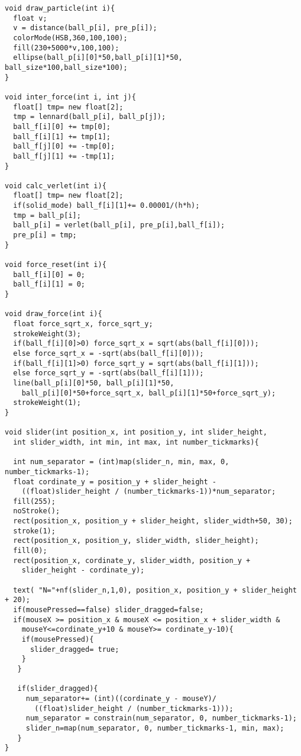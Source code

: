 \begin{framed}
{\begin{verbatim}
void draw_particle(int i){
  float v;
  v = distance(ball_p[i], pre_p[i]);
  colorMode(HSB,360,100,100);
  fill(230+5000*v,100,100);  
  ellipse(ball_p[i][0]*50,ball_p[i][1]*50, ball_size*100,ball_size*100);
}
  
void inter_force(int i, int j){
  float[] tmp= new float[2];
  tmp = lennard(ball_p[i], ball_p[j]);
  ball_f[i][0] += tmp[0];
  ball_f[i][1] += tmp[1];
  ball_f[j][0] += -tmp[0];
  ball_f[j][1] += -tmp[1];
}

void calc_verlet(int i){
  float[] tmp= new float[2];
  if(solid_mode) ball_f[i][1]+= 0.00001/(h*h);
  tmp = ball_p[i];
  ball_p[i] = verlet(ball_p[i], pre_p[i],ball_f[i]);
  pre_p[i] = tmp; 
}

void force_reset(int i){
  ball_f[i][0] = 0; 
  ball_f[i][1] = 0;
}

void draw_force(int i){
  float force_sqrt_x, force_sqrt_y;
  strokeWeight(3);
  if(ball_f[i][0]>0) force_sqrt_x = sqrt(abs(ball_f[i][0]));
  else force_sqrt_x = -sqrt(abs(ball_f[i][0]));
  if(ball_f[i][1]>0) force_sqrt_y = sqrt(abs(ball_f[i][1]));
  else force_sqrt_y = -sqrt(abs(ball_f[i][1]));
  line(ball_p[i][0]*50, ball_p[i][1]*50,
    ball_p[i][0]*50+force_sqrt_x, ball_p[i][1]*50+force_sqrt_y);
  strokeWeight(1);
}

void slider(int position_x, int position_y, int slider_height,
  int slider_width, int min, int max, int number_tickmarks){
  
  int num_separator = (int)map(slider_n, min, max, 0, number_tickmarks-1);
  float cordinate_y = position_y + slider_height -
    ((float)slider_height / (number_tickmarks-1))*num_separator;
  fill(255);
  noStroke();
  rect(position_x, position_y + slider_height, slider_width+50, 30); 
  stroke(1);
  rect(position_x, position_y, slider_width, slider_height);
  fill(0);
  rect(position_x, cordinate_y, slider_width, position_y +
    slider_height - cordinate_y);
  
  text( "N="+nf(slider_n,1,0), position_x, position_y + slider_height + 20);
  if(mousePressed==false) slider_dragged=false;
  if(mouseX >= position_x & mouseX <= position_x + slider_width &
    mouseY<=cordinate_y+10 & mouseY>= cordinate_y-10){
    if(mousePressed){
      slider_dragged= true;
    }
   }
   
   if(slider_dragged){
     num_separator+= (int)((cordinate_y - mouseY)/
       ((float)slider_height / (number_tickmarks-1)));
     num_separator = constrain(num_separator, 0, number_tickmarks-1);
     slider_n=map(num_separator, 0, number_tickmarks-1, min, max);
   }
}


\end{verbatim}}
\end{framed}
